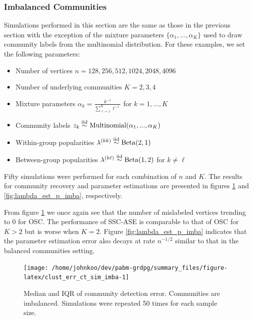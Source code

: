 \documentclass[
  11pt,
]{article}
\providecommand{\tightlist}{%
  \setlength{\itemsep}{0pt}\setlength{\parskip}{0pt}}
\theoremstyle{definition}
\theoremstyle{definition}
\theoremstyle{definition}
\theoremstyle{definition}
\theoremstyle{remark}
\begin{document}
\hypertarget{sec:imbalanced-communities}{%
\subsubsection{Imbalanced Communities}\label{sec:imbalanced-communities}}

Simulations performed in this section are the same as those in the
previous section with the exception of the mixture parameters
\(\{\alpha_1, ..., \alpha_K\}\) used to draw community labels from the
multinomial distribution. For these examples, we set the following
parameters:

\begin{itemize}
\tightlist
\item
  Number of vertices \(n = 128, 256, 512, 1024, 2048, 4096\)
\item
  Number of underlying communities \(K = 2, 3, 4\)
\item
  Mixture parameters \(\alpha_k = \frac{k^{-1}}{\sum_{\ell=1}^K \ell^{-1}}\)
  for \(k = 1, ..., K\)
\item
  Community labels
  \(z_k \stackrel{\text{iid}}{\sim} \mathrm{Multinomial}(\alpha_1, ..., \alpha_K)\)
\item
  Within-group popularities
  \(\lambda^{(kk)} \stackrel{\text{iid}}{\sim} \mathrm{Beta}(2, 1)\)
\item
  Between-group popularities
  \(\lambda^{(k \ell)} \stackrel{\text{iid}}{\sim} \mathrm{Beta}(1, 2)\) for
  \(k \neq \ell\)
\end{itemize}

Fifty simulations were performed for each combination of \(n\) and \(K\).
The results for community recovery and parameter estimations are presented in figures \ref{fig:clust_err_ct_sim_imba} and \ref{fig:lambda_est_p_imba}, respectively.

From figure \ref{fig:clust_err_ct_sim_imba} we once again see that the
number of mislabeled vertices trending to \(0\) for OSC.
The performance of SSC-ASE is comparable to that of OSC for \(K > 2\) but is worse when \(K = 2\).
Figure \ref{fig:lambda_est_p_imba} indicates that the parameter estimation error also decays at rate \(n^{-1/2}\) similar to that in the balanced communities setting.

\begin{figure}[H]
{\centering \texttt{[image: /home/johnkoo/dev/pabm-grdpg/summary\_files/figure-latex/clust\_err\_ct\_sim\_imba-1]}
}
\caption{Median and IQR of community detection error. Communities are imbalanced. 
Simulations were repeated 50 times for each sample size.}\label{fig:clust_err_ct_sim_imba}
\end{figure}
\end{document}
